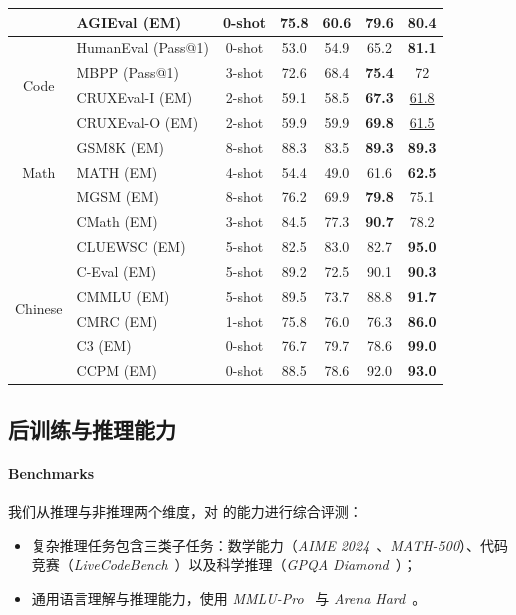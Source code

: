 \begin{table}[!h]
\begin{tabular}{@{}c l c | c c c | c@{}}
    & AGIEval {\tiny (EM)} & 0-shot & 75.8 & 60.6 & 79.6 & \textbf{80.4} \\
    \midrule
    \multirow{4}{*}{Code} & HumanEval {\tiny (Pass@1)} & 0-shot & 53.0 & 54.9 & 65.2 & \textbf{81.1} \\
    & MBPP {\tiny (Pass@1)} & 3-shot & 72.6 & 68.4 & \textbf{75.4} & 72  \\
    & CRUXEval-I {\tiny (EM)} & 2-shot & 59.1 & 58.5 & \textbf{67.3} & \underline{61.8}  \\
    & CRUXEval-O {\tiny (EM)} & 2-shot & 59.9 & 59.9 & \textbf{69.8} & \underline{61.5}  \\
    \midrule
    \multirow{3}{*}{Math} 
    & GSM8K {\tiny (EM)} & 8-shot & 88.3 & 83.5 & \textbf{89.3} & \textbf{89.3}  \\
    & MATH {\tiny (EM)} & 4-shot & 54.4 & 49.0 & 61.6 & \textbf{62.5}  \\
    & MGSM {\tiny (EM)} & 8-shot & 76.2 & 69.9 & \textbf{79.8} & 75.1  \\
    & CMath {\tiny (EM)} & 3-shot & 84.5 & 77.3 & \textbf{90.7} & 78.2  \\
    \midrule
    \multirow{7}{*}{Chinese} & CLUEWSC {\tiny (EM)} & 5-shot & 82.5 & 83.0 & 82.7 & \textbf{95.0} \\
    & C-Eval {\tiny (EM)} & 5-shot & 89.2 & 72.5 & 90.1 & \textbf{90.3}  \\
    & CMMLU {\tiny (EM)} & 5-shot & 89.5 & 73.7 & 88.8 & \textbf{91.7} \\
    & CMRC {\tiny (EM)} & 1-shot & 75.8 & 76.0 & 76.3 & \textbf{86.0}  \\
    & C3 {\tiny (EM)} & 0-shot & 76.7 & 79.7 & 78.6 & \textbf{99.0} \\
    & CCPM {\tiny (EM)} & 0-shot & 88.5 & 78.6 & 92.0 & \textbf{93.0}  \\
    \bottomrule
    \end{tabular}
    \label{tab:main}
\end{table}


\subsection{后训练与推理能力}
\paragraph{Benchmarks} 我们从推理与非推理两个维度，对 \modelname 的能力进行综合评测：

\begin{itemize}[leftmargin=*]
\item 复杂推理任务包含三类子任务：数学能力（\textit{AIME 2024}~\cite{MAA}、\textit{MATH-500}）、代码竞赛（\textit{LiveCodeBench}~\cite{jain2024livecodebench}）以及科学推理（\textit{GPQA Diamond}~\cite{rein2024gpqa}）；
\item 通用语言理解与推理能力，使用 \textit{MMLU-Pro}~\cite{gema2024we} 与 \textit{Arena Hard}~\cite{arenahard2024}。
\end{itemize}


